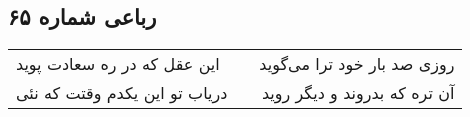 \begin{center}
\section*{رباعی شماره ۶۵}
\label{sec:sh065}
\begin{longtable}{l p{0.5cm} r}
این عقل که در ره سعادت پوید
&&
روزی صد بار خود ترا می‌گوید
\\
دریاب تو این یکدم وقتت که نئی
&&
آن تره که بدروند و دیگر روید
\\
\end{longtable}
\end{center}
